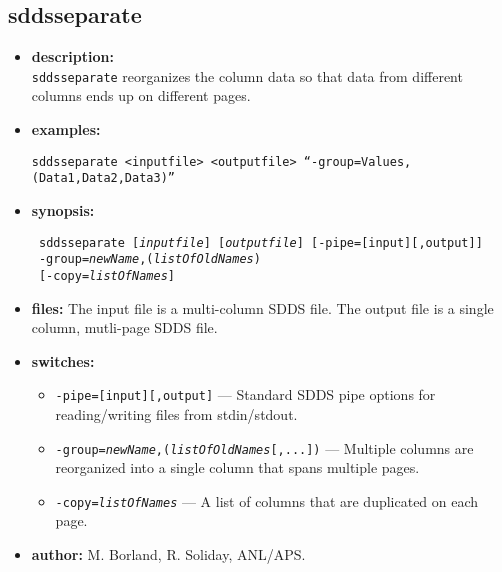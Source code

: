 \newpage 
\subsection{sddsseparate} 
\label{sddsseparate} 
 
\begin{itemize} 
\item {\bf description:} \hspace*{1mm}\\ 
{\tt sddsseparate} reorganizes the column data so that data from different columns ends up on different pages.
\item {\bf examples:} 
\begin{flushleft}
{\tt sddsseparate <inputfile> <outputfile> ``-group=Values,(Data1,Data2,Data3)'' }
\end{flushleft} 
\item {\bf synopsis:}  
\begin{flushleft}
{\tt 
sddsseparate [{\em inputfile}] [{\em outputfile}] [-pipe=[input][,output]] \\ \
-group={\em newName},({\em listOfOldNames}) \\ \
{}[-copy={\em listOfNames}]}
\end{flushleft} 
\item {\bf files:} 
The input file is a multi-column SDDS file. The output file is a single column, mutli-page SDDS file. 
\item {\bf switches:} 
    \begin{itemize} 
    \item {\tt -pipe=[input][,output]} --- Standard SDDS pipe options for reading/writing files from stdin/stdout.
    \item {\tt -group={\em newName},({\em listOfOldNames}[,...])} --- Multiple columns are reorganized into a single column that spans multiple pages.
    \item {\tt -copy={\em listOfNames}} --- A list of columns that are duplicated on each page.
\end{itemize} 

\item {\bf author:} M. Borland, R. Soliday, ANL/APS. 
\end{itemize} 
 
